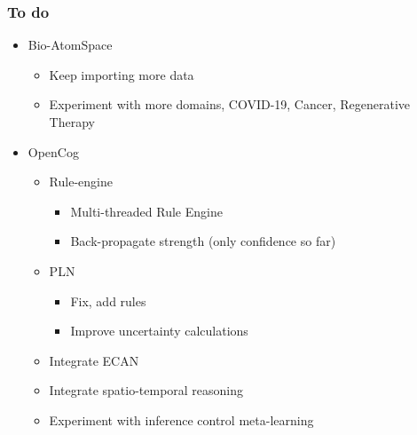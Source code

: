 \documentclass[aspectratio=169]{beamer}
\begin{document}
\begin{frame}
  \frametitle{To do}

  \begin{itemize}
  \item Bio-AtomSpace
    \begin{itemize}
    \item Keep importing more data
    \item Experiment with more domains, COVID-19, Cancer, Regenerative Therapy
    \end{itemize}
  \item OpenCog
    \begin{itemize}
    \item Rule-engine
      \begin{itemize}
      \item Multi-threaded Rule Engine
      \item Back-propagate strength (only confidence so far)
      \end{itemize}
    \item PLN
      \begin{itemize}
      \item Fix, add rules
      \item Improve uncertainty calculations
      \end{itemize}
    \item Integrate ECAN
    \item Integrate spatio-temporal reasoning
    \item Experiment with inference control meta-learning
    \end{itemize}
  \end{itemize}
\end{frame}
\end{document}
